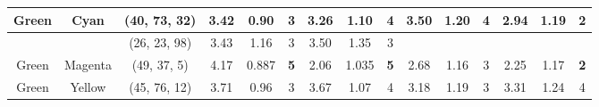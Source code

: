\begin{table}[htbp]
{\begin{tabular}{@{}ccclcccccccccccc@{}}
    Green                   & \multicolumn{1}{c|}{Cyan}                      & \multicolumn{2}{c|}{\cellcolor[HTML]{00FF80}(40, 73, 32)}  & \multicolumn{1}{c|}{3.42} & \multicolumn{1}{c|}{0.90}  & \multicolumn{1}{c|}{3}                                  & \multicolumn{1}{c|}{3.26} & \multicolumn{1}{c|}{1.10}  & \multicolumn{1}{c||}{4}                                  & \multicolumn{1}{c|}{3.50}                   & \multicolumn{1}{c|}{1.20}                   & \multicolumn{1}{c|}{4}                                  & \multicolumn{1}{c|}{2.94}                   & \multicolumn{1}{c|}{1.19}                   & \multicolumn{1}{c|}{\cellcolor[HTML]{FD6864}\textbf{2}}                   \\ \midrule
                            & \multicolumn{1}{c|}{}                          & \multicolumn{2}{c|}{\cellcolor[HTML]{0080FF}(26, 23, 98)}  & \multicolumn{1}{c|}{3.43} & \multicolumn{1}{c|}{1.16}  & \multicolumn{1}{c|}{3}                                  & \multicolumn{1}{c|}{3.50} & \multicolumn{1}{c|}{1.35}  & \multicolumn{1}{c||}{3}                                  & \multicolumn{1}{c|}{}                       & \multicolumn{1}{c|}{}                       & \multicolumn{1}{c|}{}                                   & \multicolumn{1}{c|}{}                       & \multicolumn{1}{c|}{}                       & \multicolumn{1}{c|}{\cellcolor[HTML]{FD6864}}                             \\ \cmidrule(lr){3-10}
    \multirow{-2}{*}{Green} & \multicolumn{1}{c|}{\multirow{-2}{*}{Magenta}} & \multicolumn{2}{c|}{\cellcolor[HTML]{FF8000}(49, 37, 5)}   & \multicolumn{1}{c|}{4.17} & \multicolumn{1}{c|}{0.887} & \multicolumn{1}{c|}{\cellcolor[HTML]{32CB00}\textbf{5}} & \multicolumn{1}{c|}{2.06} & \multicolumn{1}{c|}{1.035} & \multicolumn{1}{c||}{\cellcolor[HTML]{32CB00}\textbf{5}} & \multicolumn{1}{c|}{\multirow{-2}{*}{2.68}} & \multicolumn{1}{c|}{\multirow{-2}{*}{1.16}} & \multicolumn{1}{c|}{\multirow{-2}{*}{3}}                & \multicolumn{1}{c|}{\multirow{-2}{*}{2.25}} & \multicolumn{1}{c|}{\multirow{-2}{*}{1.17}} & \multicolumn{1}{c|}{\multirow{-2}{*}{\cellcolor[HTML]{FD6864}\textbf{2}}} \\ \midrule
    Green                   & \multicolumn{1}{c|}{Yellow}                    & \multicolumn{2}{c|}{\cellcolor[HTML]{80FF00}(45, 76, 12)}  & \multicolumn{1}{c|}{3.71} & \multicolumn{1}{c|}{0.96}  & \multicolumn{1}{c|}{3}                                  & \multicolumn{1}{c|}{3.67} & \multicolumn{1}{c|}{1.07}  & \multicolumn{1}{c||}{4}                                  & \multicolumn{1}{c|}{3.18}                   & \multicolumn{1}{c|}{1.19}                   & \multicolumn{1}{c|}{3}                                  & \multicolumn{1}{c|}{3.31}                   & \multicolumn{1}{c|}{1.24}                   & \multicolumn{1}{c|}{4}                                                    \\ \midrule

\end{tabular}}
\end{table}
